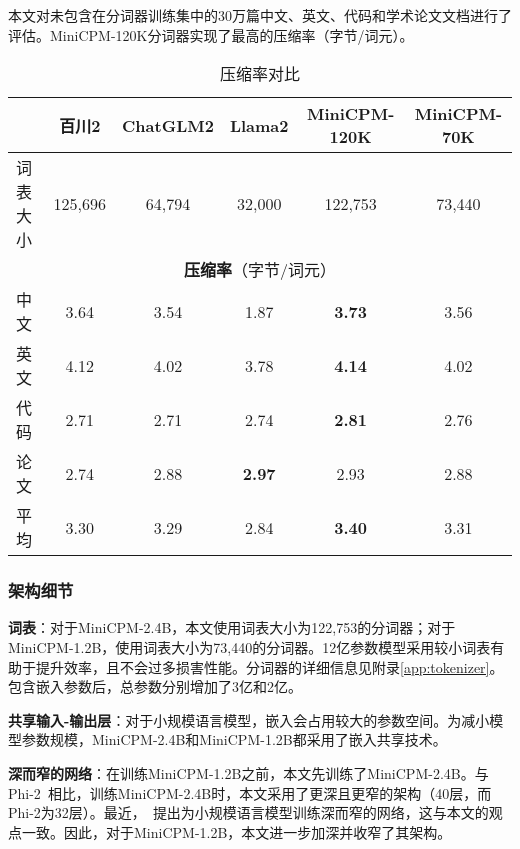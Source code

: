 本文对未包含在分词器训练集中的30万篇中文、英文、代码和学术论文文档进行了评估。MiniCPM-120K分词器实现了最高的压缩率（字节/词元）。

\begin{table}[htbp]
    \centering
    \caption{压缩率对比}
    \begin{tabular}{lccccc}
    \toprule
      & {\textbf{百川2}}  & {\textbf{ChatGLM2}} & {\textbf{Llama2}} & {\textbf{MiniCPM-120K}}  & {\textbf{MiniCPM-70K}}\\
    \midrule
    词表大小 & 125,696 & 64,794 & 32,000 & 122,753 & 73,440\\
    \midrule
    \multicolumn{6}{c}{\textbf{压缩率}（字节/词元） }\\
    \midrule
    中文 & 3.64   & 3.54  & 1.87  & \textbf{3.73} &  3.56 \\
    英文 & 4.12   & 4.02  & 3.78  & \textbf{4.14} & 4.02 \\
    代码    & 2.71   & 2.71  & 2.74  & \textbf{2.81} & 2.76 \\
    论文   & 2.74   & 2.88  & \textbf{2.97}  & 2.93 & 2.88\\
    \midrule
    平均 & 3.30   & 3.29  & 2.84  & \textbf{3.40}  & 3.31 \\
    \bottomrule
    \end{tabular}
    \label{tab:compression_ratio}
\end{table}
    


\subsubsection{架构细节}

\noindent\textbf{词表}：对于MiniCPM-2.4B，本文使用词表大小为122,753的分词器；对于MiniCPM-1.2B，使用词表大小为73,440的分词器。12亿参数模型采用较小词表有助于提升效率，且不会过多损害性能。分词器的详细信息见附录\ref{app:tokenizer}。包含嵌入参数后，总参数分别增加了3亿和2亿。 

\noindent\textbf{共享输入-输出层}：对于小规模语言模型，嵌入会占用较大的参数空间。为减小模型参数规模，MiniCPM-2.4B和MiniCPM-1.2B都采用了嵌入共享技术。 

\noindent\textbf{深而窄的网络}：在训练MiniCPM-1.2B之前，本文先训练了MiniCPM-2.4B。与Phi-2~\citep{Javaheripi2023Phi2}相比，训练MiniCPM-2.4B时，本文采用了更深且更窄的架构（40层，而Phi-2为32层）。最近，~\cite{liu2024mobilellm}提出为小规模语言模型训练深而窄的网络，这与本文的观点一致。因此，对于MiniCPM-1.2B，本文进一步加深并收窄了其架构。 

